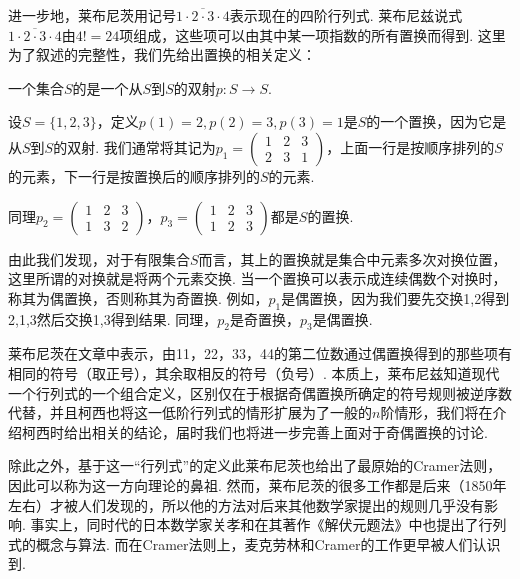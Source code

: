 进一步地，莱布尼茨用记号$\overline{1\cdot 2\cdot 3\cdot 4}$表示现在的四阶行列式. 莱布尼兹说式$\overline{1\cdot 2\cdot 3\cdot 4}$由$4!=24$项组成，这些项可以由其中某一项指数的所有置换而得到. 这里为了叙述的完整性，我们先给出置换的相关定义：
\begin{definition}[置换]
    一个集合$S$的是一个从$S$到$S$的双射$p:S\to S$.
\end{definition}

\begin{example}
    设$S=\{1,2,3\}$，定义$p(1)=2,p(2)=3,p(3)=1$是$S$的一个置换，因为它是从$S$到$S$的双射. 我们通常将其记为$p_1=\begin{pmatrix}
            1 & 2 & 3 \\
            2 & 3 & 1
        \end{pmatrix}$，上面一行是按顺序排列的$S$的元素，下一行是按置换后的顺序排列的$S$的元素.

    同理$p_2=\begin{pmatrix}
            1 & 2 & 3 \\
            1 & 3 & 2
        \end{pmatrix}$，$p_3=\begin{pmatrix}
            1 & 2 & 3 \\
            1 & 2 & 3
        \end{pmatrix}$都是$S$的置换.
\end{example}

由此我们发现，对于有限集合$S$而言，其上的置换就是集合中元素多次对换位置，这里所谓的对换就是将两个元素交换. 当一个置换可以表示成连续偶数个对换时，称其为偶置换，否则称其为奇置换. 例如，$p_1$是偶置换，因为我们要先交换1,2得到2,1,3然后交换1,3得到结果. 同理，$p_2$是奇置换，$p_3$是偶置换.

莱布尼茨在文章中表示，由11，22，33，44的第二位数通过偶置换得到的那些项有相同的符号（取正号），其余取相反的符号（负号）. 本质上，莱布尼兹知道现代一个行列式的一个组合定义，区别仅在于根据奇偶置换所确定的符号规则被逆序数代替，并且柯西也将这一低阶行列式的情形扩展为了一般的$n$阶情形，我们将在介绍柯西时给出相关的结论，届时我们也将进一步完善上面对于奇偶置换的讨论.

除此之外，基于这一``行列式''的定义此莱布尼茨也给出了最原始的Cramer法则，因此可以称为这一方向理论的鼻祖. 然而，莱布尼茨的很多工作都是后来（1850年左右）才被人们发现的，所以他的方法对后来其他数学家提出的规则几乎没有影响. 事实上，同时代的日本数学家关孝和在其著作《解伏元题法》中也提出了行列式的概念与算法. 而在Cramer法则上，麦克劳林和Cramer的工作更早被人们认识到.

